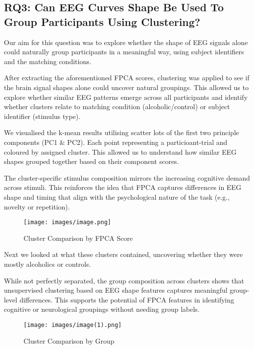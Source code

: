 \documentclass{article}
\begin{document}
\subsection{RQ3: Can EEG Curves Shape Be Used To Group Participants
Using
Clustering?}\label{rq3-can-eeg-curves-shape-be-used-to-group-participants-using-clustering}

Our aim for this question was to explore whether the shape of EEG
signals alone could naturally group participants in a meaningful way,
using subject identifiers and the matching conditions.

After extracting the aforementioned FPCA scores, clustering was applied
to see if the brain signal shapes alone could uncover natural groupings.
This allowed us to explore whether similar EEG patterns emerge across
all participants and identify whether clusters relate to matching
condition (alcoholic/control) or subject identifier (stimulus type).

We visualised the k-mean results utilising scatter lots of the first two
principle components (PC1 \& PC2). Each point representing a
particioant-trial and coloured by assigned cluster. This allowed us to
understand how similar EEG shapes grouped together based on their
component scores.

The cluster-specific stimulus composition mirrors the increasing
cognitive demand across stimuli. This reinforces the idea that FPCA
captures differences in EEG shape and timing that align with the
psychological nature of the task (e.g., novelty or repetition).

\begin{figure}[H]
\centering
\texttt{[image: images/image.png]}
\caption{Cluster Comparison by FPCA Score}
\end{figure}

Next we looked at what these clusters contained, uncovering whether they
were mostly alcoholics or controls.

While not perfectly separated, the group composition across clusters
shows that unsupervised clustering based on EEG shape features captures
meaningful group-level differences. This supports the potential of FPCA
features in identifying cognitive or neurological groupings without
needing group labels.

\begin{figure}[H]
\centering
\texttt{[image: images/image(1).png]}
\caption{Cluster Comparison by Group}
\end{figure}
\end{document}
